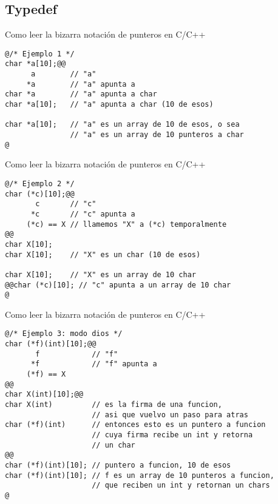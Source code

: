 \subsection{Typedef}
\begin{frame}[fragile]{Como leer la bizarra notaci\'on de punteros en C/C++}
         \begin{lstlisting}[style=dimmided]
@/* Ejemplo 1 */
char *a[10];@@
      a        // "a"
     *a        // "a" apunta a
char *a        // "a" apunta a char
char *a[10];   // "a" apunta a char (10 de esos)

char *a[10];   // "a" es un array de 10 de esos, o sea
               // "a" es un array de 10 punteros a char
@
         \end{lstlisting}
\end{frame}
\begin{frame}[fragile]{Como leer la bizarra notaci\'on de punteros en C/C++}
         \begin{lstlisting}[style=dimmided]
@/* Ejemplo 2 */
char (*c)[10];@@
       c       // "c"
      *c       // "c" apunta a
     (*c) == X // llamemos "X" a (*c) temporalmente
@@
char X[10];
char X[10];    // "X" es un char (10 de esos)

char X[10];    // "X" es un array de 10 char
@@char (*c)[10]; // "c" apunta a un array de 10 char
@
         \end{lstlisting}
\end{frame}
\begin{frame}[fragile]{Como leer la bizarra notaci\'on de punteros en C/C++}
         \begin{lstlisting}[style=dimmided]
@/* Ejemplo 3: modo dios */
char (*f)(int)[10];@@
       f            // "f"
      *f            // "f" apunta a
     (*f) == X
@@
char X(int)[10];@@
char X(int)         // es la firma de una funcion,
                    // asi que vuelvo un paso para atras
char (*f)(int)      // entonces esto es un puntero a funcion
                    // cuya firma recibe un int y retorna
                    // un char
@@
char (*f)(int)[10]; // puntero a funcion, 10 de esos
char (*f)(int)[10]; // f es un array de 10 punteros a funcion,
                    // que reciben un int y retornan un chars
@
         \end{lstlisting}
\end{frame}

